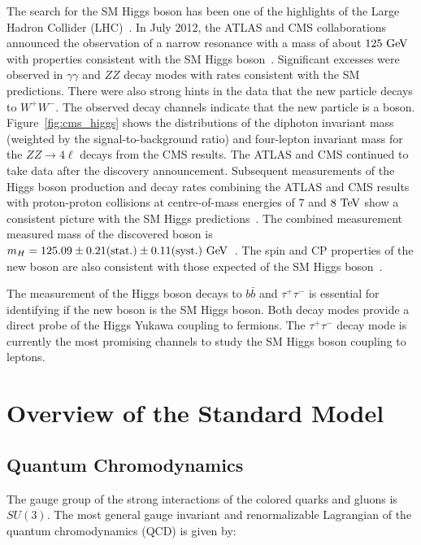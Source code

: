 The search for the SM Higgs boson has been one of the highlights of the Large Hadron Collider (LHC)~\cite{1748-0221-3-08-S08001}. In July 2012, the ATLAS and CMS collaborations announced the observation of a narrow resonance with a mass of about $125~\mathrm{Ge\kern -0.1em V}$ with properties consistent with the SM Higgs boson~\cite{Aad:2012tfa,Chatrchyan:2012xdj}. Significant excesses were observed in $\gamma\gamma$ and $ZZ$ decay modes with rates consistent with the SM predictions. There were also strong hints in the data that the new particle decays to $W^+W^-$. The observed decay channels indicate that the new particle is a boson. Figure~\ref{fig:cms_higgs} shows the distributions of the diphoton invariant mass (weighted by the signal-to-background ratio) and four-lepton invariant mass for the $ZZ \rightarrow 4\ell$ decays from the CMS results. The ATLAS and CMS continued to take data after the discovery announcement. Subsequent measurements of the Higgs boson production and decay rates combining the ATLAS and CMS results with proton-proton collisions at centre-of-mass energies of $7$ and $8~\mathrm{Te\kern -0.1em V}$ show a consistent picture with the SM Higgs predictions~\cite{Khachatryan:2016vau}. The combined measurement measured mass of the discovered boson is $m_{H}=125.09 \pm 0.21 \mathrm{(stat.)} \pm 0.11 \mathrm{(syst.)}~\mathrm{Ge\kern -0.1em V}$~\cite{Aad:2015zhl}. The spin and CP properties of the new boson are also consistent with those expected of the SM Higgs boson~\cite{Chatrchyan:2012jja,Aad:2013xqa,Khachatryan:2014kca}.

The measurement of the Higgs boson decays to $b\bar{b}$ and $\tau^{+}\tau^{-}$ is essential for identifying if the new boson is the SM Higgs boson. Both decay modes provide a direct probe of the Higgs Yukawa coupling to fermions. The $\tau^{+}\tau^{-}$ decay mode is currently the most promising channels to study the SM Higgs boson coupling to leptons.

\section{Overview of the Standard Model}

\subsection{Quantum Chromodynamics}

The gauge group of the strong interactions of the colored quarks and gluons is $SU(3)$. The most general gauge invariant and renormalizable Lagrangian of the quantum chromodynamics (QCD) is given by:


